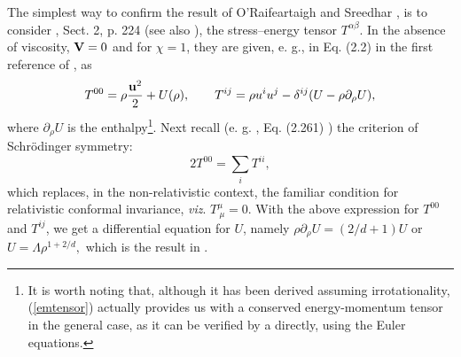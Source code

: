 \documentclass[11pt,a4paper]{article}
\begin{document}
The simplest way to confirm the result of O'Raifeartaigh and
Sreedhar \cite{RS},
is to consider \cite{HH}, Sect. 2, p. 224
(see also \cite{JPRIV}), the stress--energy tensor $T^{\alpha\beta}$.
In the absence of viscosity, ${\bf V}=0$
and for $\chi=1$, they are given, e. g., in Eq. (2.2) in the first
reference of
\cite{JAC}, as
\begin{equation}
	T^{00}=\rho\frac{{\bf u}^2}{2}+U(\rho),
	\qquad
	T^{ij}=\rho u^{i}u^{j}-\delta^{ij}(U-\rho\partial_{\rho}U),
    \label{emtensor}
\end{equation}
where $\partial_{\rho}U$ is the enthalpy\footnote{It is worth
noting that, although it has been derived assuming irrotationality,
(\ref{emtensor}) actually provides us with a conserved energy-momentum
tensor
in the general case, as it can be verified by a directly,
using the Euler equations.}.
Next recall (e. g.
\cite{JP}, Eq. (2.261) ) the criterion
of Schr\"odinger symmetry:
\begin{equation}
    2T^{00}=\sum_{i}T^{ii},
    \label{nrtracecond}
 \end{equation}
which replaces, in the non-relativistic context,
the familiar  condition for relativistic conformal
invariance, {\it viz}. $T^{\mu}_{\ \mu}=0$. With the above expression
for $T^{00}$ and $T^{ij}$, we get
 a differential equation for $U$, namely
$\rho\partial_{\rho}U=(2/d+1)U$ or
$
U=\Lambda\rho^{1+2/d},
$
which is the result in \cite{RS}.
\end{document}
